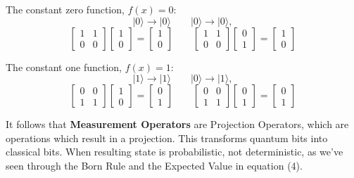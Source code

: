 \documentclass[letterpaper, 10 pt, conference]{ieeeconf}
\begin{document}
The constant zero function, \( f(x) = 0 \):
\[
|0\rangle \to |0\rangle \quad \quad |0\rangle \to |0\rangle,
\]
\[
\begin{bmatrix}
1 & 1 \\
0 & 0
\end{bmatrix}
\begin{bmatrix} 1 \\ 0 \end{bmatrix} =
\begin{bmatrix} 1 \\ 0 \end{bmatrix}
\quad \quad
\begin{bmatrix}
1 & 1 \\
0 & 0
\end{bmatrix}
\begin{bmatrix} 0 \\ 1 \end{bmatrix} =
\begin{bmatrix} 1 \\ 0 \end{bmatrix}
\]

The constant one function, \( f(x) = 1 \):
\[
|1\rangle \to |1\rangle \quad \quad |0\rangle \to |1\rangle,
\]
\[
\begin{bmatrix}
0 & 0 \\
1 & 1
\end{bmatrix}
\begin{bmatrix} 1 \\ 0 \end{bmatrix} =
\begin{bmatrix} 0 \\ 1 \end{bmatrix}
\quad \quad
\begin{bmatrix}
0 & 0 \\
1 & 1
\end{bmatrix}
\begin{bmatrix} 0 \\ 1 \end{bmatrix} =
\begin{bmatrix} 0 \\ 1 \end{bmatrix}
\]

It follows that \textbf{Measurement Operators} are Projection Operators, which are operations which result in a projection.  This transforms quantum bits into classical bits.  When resulting state is probabilistic, not deterministic, as we've seen through the Born Rule and the Expected Value in equation (4).
\end{document}
